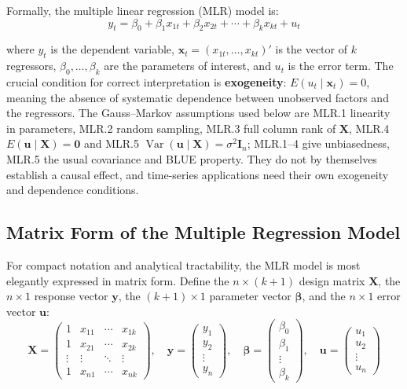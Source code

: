 Formally, the multiple linear regression (MLR) model is:
\begin{equation}
y_t = \beta_0 + \beta_1 x_{1t} + \beta_2 x_{2t} + \cdots + \beta_k x_{kt} + u_t
\end{equation}

where $y_t$ is the dependent variable, $\mathbf{x}_t = (x_{1t}, \ldots, x_{kt})'$ is the vector of $k$ regressors, $\beta_0, \ldots, \beta_k$ are the parameters of interest, and $u_t$ is the error term. The crucial condition for correct interpretation is \textbf{exogeneity}: $E(u_t \mid \mathbf{x}_t) = 0$, meaning the absence of systematic dependence between unobserved factors and the regressors. The Gauss--Markov assumptions used below are MLR.1 linearity in parameters, MLR.2 random sampling, MLR.3 full column rank of $\mathbf X$, MLR.4 $E(\mathbf u\mid\mathbf X)=\mathbf 0$ and MLR.5 $\operatorname{Var}(\mathbf u\mid\mathbf X)=\sigma^2\mathbf I_n$; MLR.1--4 give unbiasedness, MLR.5 the usual covariance and BLUE property. They do not by themselves establish a causal effect, and time-series applications need their own exogeneity and dependence conditions.
\subsection{Matrix Form of the Multiple Regression Model}

For compact notation and analytical tractability, the MLR model is most elegantly expressed in matrix form. Define the $n \times (k+1)$ design matrix $\mathbf{X}$, the $n \times 1$ response vector $\mathbf{y}$, the $(k+1) \times 1$ parameter vector $\boldsymbol{\beta}$, and the $n \times 1$ error vector $\mathbf{u}$:
$$\mathbf{X} = \begin{pmatrix} 1 & x_{11} & \cdots & x_{1k} \\ 1 & x_{21} & \cdots & x_{2k} \\ \vdots & \vdots & \ddots & \vdots \\ 1 & x_{n1} & \cdots & x_{nk} \end{pmatrix}, \quad \mathbf{y} = \begin{pmatrix} y_1 \\ y_2 \\ \vdots \\ y_n \end{pmatrix}, \quad \boldsymbol{\beta} = \begin{pmatrix} \beta_0 \\ \beta_1 \\ \vdots \\ \beta_k \end{pmatrix}, \quad \mathbf{u} = \begin{pmatrix} u_1 \\ u_2 \\ \vdots \\ u_n \end{pmatrix}$$

